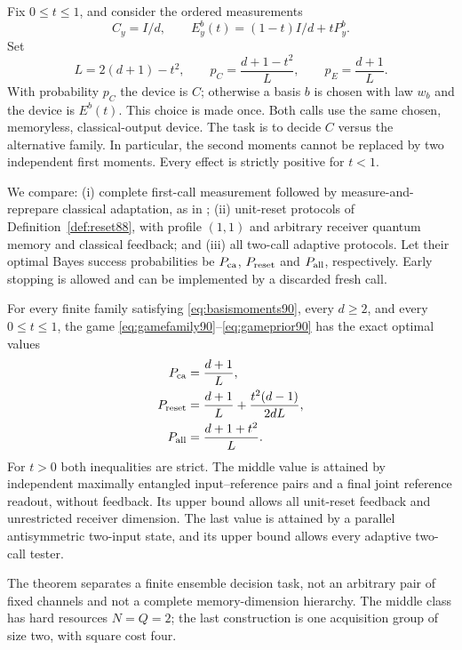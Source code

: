 Fix $0\le t\le1$, and consider the ordered measurements
\begin{equation}\label{eq:gamefamily90}
 C_y=I/d,\qquad E_y^b(t)=(1-t)I/d+tP_y^b.
\end{equation}
Set
\begin{equation}\label{eq:gameprior90}
 L=2(d+1)-t^2,\qquad
 p_C=\frac{d+1-t^2}{L},\qquad p_E=\frac{d+1}{L}.
\end{equation}
With probability $p_C$ the device is $C$; otherwise a basis $b$ is chosen
with law $w_b$ and the device is $E^b(t)$.  This choice is made once.
Both calls use the same chosen, memoryless, classical-output device.
The task is to decide $C$ versus the alternative family.  In particular,
the second moments cannot be replaced by two independent first moments.
Every effect is strictly positive for $t<1$.

We compare: (i) complete first-call measurement followed by
measure-and-reprepare classical adaptation, as in
\cite[Definition~23]{OZNPQ89}; (ii) unit-reset protocols of
Definition~\ref{def:reset88}, with profile $(1,1)$ and arbitrary receiver
quantum memory and classical feedback; and (iii) all two-call adaptive
protocols.  Let their optimal Bayes success probabilities be
$P_{\rm ca}$, $P_{\rm reset}$ and $P_{\rm all}$, respectively.
Early stopping is allowed and can be implemented by a discarded fresh call.

\begin{theorem}\label{thm:operationalhierarchy90}
For every finite family satisfying \eqref{eq:basismoments90}, every
$d\ge2$, and every $0\le t\le1$, the game \eqref{eq:gamefamily90}--\eqref{eq:gameprior90}
has the exact optimal values
\begin{equation}\label{eq:operationalhierarchy90}
\begin{split}
 P_{\rm ca}&=\frac{d+1}{L},\\
 P_{\rm reset}&=\frac{d+1}{L}+\frac{t^2(d-1)}{2dL},\\
 P_{\rm all}&=\frac{d+1+t^2}{L}.
\end{split}
\end{equation}
For $t>0$ both inequalities are strict.  The middle value is attained
by independent maximally entangled input--reference pairs and a final
joint reference readout, without feedback.  Its upper bound allows all
unit-reset feedback and unrestricted receiver dimension.  The last
value is attained by a parallel antisymmetric two-input state, and its
upper bound allows every adaptive two-call tester.
\end{theorem}
The theorem separates a finite ensemble decision task, not an arbitrary
pair of fixed channels and not a complete memory-dimension hierarchy.
The middle class has hard resources $N=Q=2$; the last construction is
one acquisition group of size two, with square cost four.

